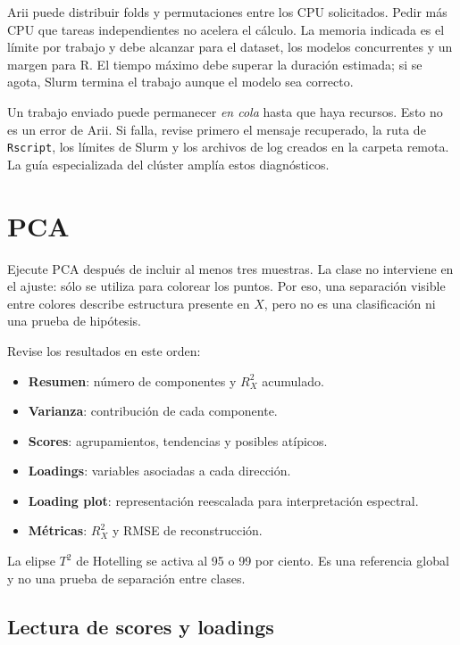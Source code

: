 \documentclass[11pt,a4paper,openany]{report}
\newcommand{\code}[1]{\texttt{#1}}
\begin{document}
Arii puede distribuir folds y permutaciones entre los CPU solicitados. Pedir más
CPU que tareas independientes no acelera el cálculo. La memoria indicada es el
límite por trabajo y debe alcanzar para el dataset, los modelos concurrentes y
un margen para R. El tiempo máximo debe superar la duración estimada; si se
agota, Slurm termina el trabajo aunque el modelo sea correcto.

Un trabajo enviado puede permanecer \emph{en cola} hasta que haya recursos. Esto
no es un error de Arii. Si falla, revise primero el mensaje recuperado, la ruta
de \code{Rscript}, los límites de Slurm y los archivos de log creados en la
carpeta remota. La guía especializada del clúster amplía estos diagnósticos.

\chapter{PCA}

Ejecute PCA después de incluir al menos tres muestras. La clase no interviene
en el ajuste: sólo se utiliza para colorear los puntos. Por eso, una separación
visible entre colores describe estructura presente en $X$, pero no es una
clasificación ni una prueba de hipótesis.

Revise los resultados en este orden:

\begin{itemize}[leftmargin=*]
  \item \textbf{Resumen}: número de componentes y $R^2_X$ acumulado.
  \item \textbf{Varianza}: contribución de cada componente.
  \item \textbf{Scores}: agrupamientos, tendencias y posibles atípicos.
  \item \textbf{Loadings}: variables asociadas a cada dirección.
  \item \textbf{Loading plot}: representación reescalada para interpretación
  espectral.
  \item \textbf{Métricas}: $R^2_X$ y RMSE de reconstrucción.
\end{itemize}

La elipse $T^2$ de Hotelling se activa al 95 o 99 por ciento. Es una referencia
global y no una prueba de separación entre clases.

\section{Lectura de scores y loadings}
\end{document}
